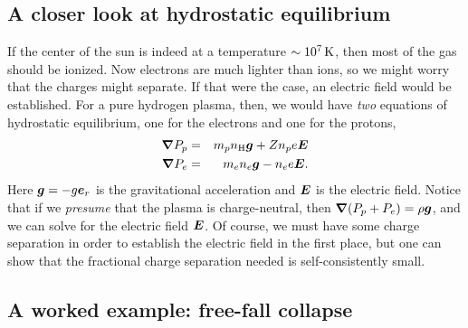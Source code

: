 \subsection{A closer look at hydrostatic equilibrium}
If the center of the sun is indeed at a temperature $\sim 10^{7}\,\mathrm{K}$, then most of the gas should be ionized. Now electrons are much lighter than ions, so we might worry that the charges might separate.  If that were the case, an electric field would be established.   For a pure hydrogen plasma, then, we would have \emph{two} equations of hydrostatic equilibrium, one for the electrons and one for the protons,
\begin{eqnarray}
\boldsymbol{\nabla} P_{p} &=& m_{p}n_{\mathrm{H}} \boldsymbol{g}  +  Z n_{p}e\boldsymbol{E} \\
\boldsymbol{\nabla} P_{e} &=& m_{e}n_{e}\boldsymbol{g} - n_{e} e \boldsymbol{E}.
\end{eqnarray}
Here $\boldsymbol{g} = -g \boldsymbol{e}_{r}$ is the gravitational acceleration and $\boldsymbol{E}$ is the electric field. Notice that if we \emph{presume} that the plasma is charge-neutral, then $\boldsymbol{\nabla} (P_{p}+P_{e}) = \rho \boldsymbol{g}$, and we can solve for the electric field $\boldsymbol{E}$. Of course, we must have some charge separation in order to establish the electric field in the first place, but one can show that the fractional charge separation needed is self-consistently small.

\subsection{A worked example: free-fall collapse}

